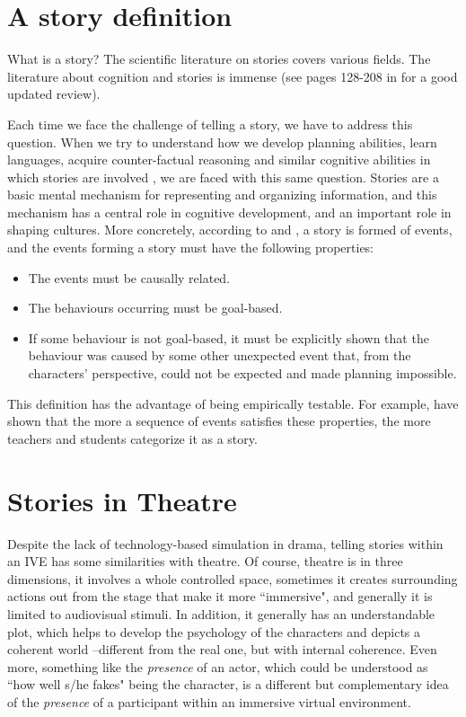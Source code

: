 \documentclass[
		twoside,openright,titlepage,numbers=noenddot,manychapters,
		headinclude,%
                footinclude=false,cleardoublepage=empty,
                BCOR=5mm,
		fontsize=11pt, %
                 enabledeprecatedfontcommands]{scrreprt}
\begin{document}
\section{A story definition}
What is a story? The scientific literature on stories covers various fields. The literature about cognition and stories is immense  (see pages 128-208 in \cite{boyd2009origin} for a good updated review).

Each time we face the challenge of telling a story, we have to address this question. When we try to understand how we develop planning abilities, learn languages, acquire counter-factual reasoning and similar cognitive abilities in which stories are involved \cite[]{boyd2009origin}, we are faced with this same question. Stories are a basic mental mechanism for representing and organizing information, and this mechanism has a central role in cognitive development, and an important role in shaping cultures. More concretely, according to \cite{stein1982ds} and \cite{stein1984csc}, a story is formed of events, and the events forming a story must have the following properties:

\begin{itemize}
  \item The events must be causally related.
  \item The behaviours occurring must be goal-based.
  \item If some behaviour is not goal-based, it must be explicitly shown that the behaviour was caused by some other unexpected event that, from the characters' perspective, could not be expected and made planning impossible.
\end{itemize}

This definition has the advantage of being empirically testable. For example, \cite{stein1984csc} have shown that the more a sequence of events satisfies these properties, the more teachers and students categorize it as a story. %




\section{Stories in Theatre}


Despite the lack of technology-based simulation in drama, telling stories within an IVE  has some similarities with theatre. Of course, theatre is in three dimensions, it involves a whole controlled space, sometimes it creates surrounding actions out from the stage that make it more ``immersive", and generally it is limited to audiovisual stimuli. In addition, it generally has an understandable plot, which helps to develop the psychology of the characters and depicts a coherent world --different from the real one, but with internal coherence. Even more, something like the \emph{presence} of an actor, which could be understood as ``how well s/he fakes" being the character, is a different but complementary idea of the \emph{presence} of a participant within an immersive virtual environment.
\end{document}
